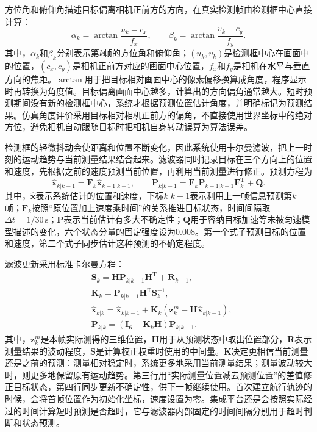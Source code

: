 方位角和俯仰角描述目标偏离相机正前方的方向，在真实检测帧由检测框中心直接计算：
\begin{equation}
\alpha_k=\arctan\frac{u_k-c_x}{f_x},\qquad
\beta_k=\arctan\frac{v_k-c_y}{f_y}.
\label{eq:ch4-angle}
\end{equation}
其中，$\alpha_k$和$\beta_k$分别表示第$k$帧的方位角和俯仰角；$(u_k,v_k)$是检测框中心在画面中的位置，$(c_x,c_y)$是相机正前方对应的画面中心位置，$f_x$和$f_y$是相机在水平与垂直方向的焦距。$\arctan$用于把目标相对画面中心的像素偏移换算成角度，程序显示时再转换为角度值。目标偏离画面中心越多，计算出的方向偏角通常越大。短时预测期间没有新的检测框中心，系统才根据预测位置估计角度，并明确标记为预测结果。仿真角度评价采用目标相对相机正前方的偏角，不直接使用世界坐标中的绝对方位，避免相机自动跟随目标时把相机自身转动误算为算法误差。

检测框的轻微抖动会使距离和位置不断变化，因此系统使用卡尔曼滤波，把上一时刻的运动趋势与当前测量结果结合起来。滤波器同时记录目标在三个方向上的位置和速度，先根据之前的速度预测当前位置，再利用当前测量进行修正。预测方程为
\begin{equation}
\hat{\mathbf{x}}_{k|k-1}=\mathbf{F}_k\hat{\mathbf{x}}_{k-1|k-1},\qquad
\mathbf{P}_{k|k-1}=\mathbf{F}_k\mathbf{P}_{k-1|k-1}\mathbf{F}_k^{\mathrm{T}}+\mathbf{Q}.
\label{eq:ch4-predict}
\end{equation}
其中，$\hat{\mathbf{x}}$表示系统估计的位置和速度，下标$k|k-1$表示利用上一帧信息预测第$k$帧；$\mathbf{F}_k$按照“原位置加上速度乘时间”的关系推进目标状态，时间间隔取$\Delta t=1/30\,\mathrm{s}$；$\mathbf{P}$表示当前估计有多大不确定性；$\mathbf{Q}$用于容纳目标加速等未被匀速模型描述的变化，六个状态分量的固定强度设为0.008。第一个式子预测目标的位置和速度，第二个式子同步估计这种预测的不确定程度。

滤波更新采用标准卡尔曼方程：
\begin{equation}
\begin{aligned}
&\mathbf{S}_k=\mathbf{H}\mathbf{P}_{k|k-1}\mathbf{H}^{\mathrm{T}}+\mathbf{R}_{k-1},\\
&\mathbf{K}_k=\mathbf{P}_{k|k-1}\mathbf{H}^{\mathrm{T}}\mathbf{S}_k^{-1},\\
&\hat{\mathbf{x}}_{k|k}=\hat{\mathbf{x}}_{k|k-1}+\mathbf{K}_k
(\mathbf{z}_k^m-\mathbf{H}\hat{\mathbf{x}}_{k|k-1}),\\
&\mathbf{P}_{k|k}=(\mathbf{I}_6-\mathbf{K}_k\mathbf{H})\mathbf{P}_{k|k-1}.
\end{aligned}
\label{eq:ch4-kalman}
\end{equation}
其中，$\mathbf{z}_k^m$是本帧实际测得的三维位置，$\mathbf{H}$用于从预测状态中取出位置部分，$\mathbf{R}$表示测量结果的波动程度，$\mathbf{S}$是计算校正权重时使用的中间量。$\mathbf{K}$决定更相信当前测量还是之前的预测：测量相对稳定时，系统更多地采用当前测量结果；测量波动较大时，则更多地保留原有运动趋势。第三行用“实际测量位置减去预测位置”的差值修正目标状态，第四行同步更新不确定性，供下一帧继续使用。首次建立航行轨迹的时候，会将首帧位置作为初始化坐标，速度设置为零。集成平台还是会按照实际经过的时间计算短时预测是否超时，它与滤波器内部固定的时间间隔分别用于超时判断和状态预测。

